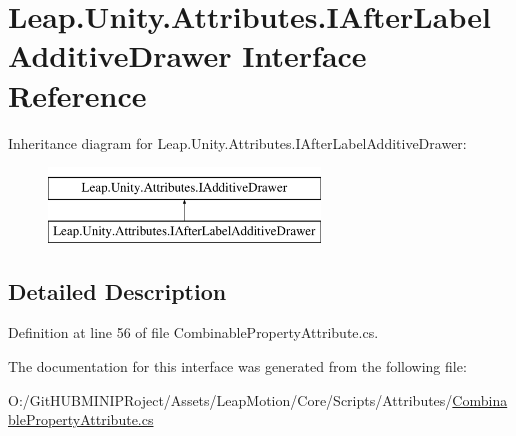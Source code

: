 \hypertarget{interface_leap_1_1_unity_1_1_attributes_1_1_i_after_label_additive_drawer}{}\section{Leap.\+Unity.\+Attributes.\+I\+After\+Label\+Additive\+Drawer Interface Reference}
\label{interface_leap_1_1_unity_1_1_attributes_1_1_i_after_label_additive_drawer}
Inheritance diagram for Leap.\+Unity.\+Attributes.\+I\+After\+Label\+Additive\+Drawer\+:\begin{figure}[H]
\begin{center}
\leavevmode
\includegraphics[height=2.000000cm]{interface_leap_1_1_unity_1_1_attributes_1_1_i_after_label_additive_drawer}
\end{center}
\end{figure}


\subsection{Detailed Description}


Definition at line 56 of file Combinable\+Property\+Attribute.\+cs.



The documentation for this interface was generated from the following file\+:\begin{DoxyCompactItemize}
\item 
O\+:/\+Git\+H\+U\+B\+M\+I\+N\+I\+P\+Roject/\+Assets/\+Leap\+Motion/\+Core/\+Scripts/\+Attributes/\mbox{\hyperlink{_combinable_property_attribute_8cs}{Combinable\+Property\+Attribute.\+cs}}\end{DoxyCompactItemize}
